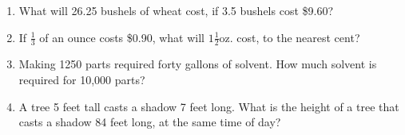 \documentclass[12pt]{article}
\begin{document}
\begin{enumerate}
\item What will 26.25 bushels of wheat cost, if 3.5 bushels cost \$9.60? 
\spacing

\item If $\frac{1}{3}$ of an ounce costs \$0.90, what will $1\frac{1}{2}$oz. cost, to the nearest cent? 
\spacing

\item Making 1250 parts required forty gallons of solvent. How much solvent is required for 10,000 parts? 
\spacing

\item A tree 5 feet tall casts a shadow 7 feet long. What is the height of a tree that casts a shadow 84 feet long, at the same time of day? 
\spacing

\end{enumerate}
\end{document}
